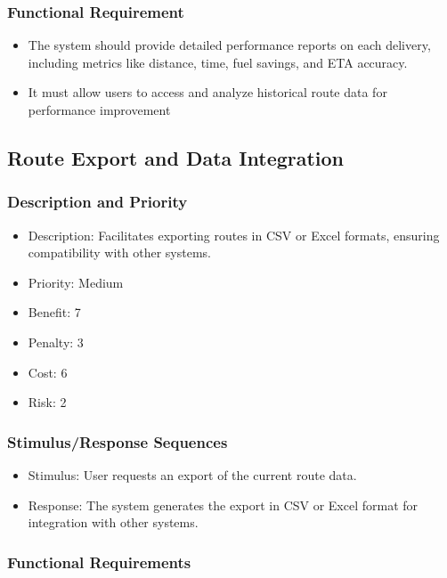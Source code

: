 \subsubsection{Functional Requirement}

\begin{itemize}
    \item The system should provide detailed performance reports on each delivery, including metrics like distance, time, fuel savings, and ETA accuracy.
    \item It must allow users to access and analyze historical route data for performance improvement
\end{itemize}

\subsection{Route Export and Data Integration}
\subsubsection{Description and Priority}

\begin{itemize}
    \item Description: Facilitates exporting routes in CSV or Excel formats, ensuring compatibility with other systems.
    \item Priority: Medium
    \item Benefit: 7
    \item Penalty: 3
    \item Cost: 6
    \item Risk: 2
\end{itemize}

\subsubsection{Stimulus/Response Sequences}

\begin{itemize}
    \item Stimulus: User requests an export of the current route data.
    \item Response: The system generates the export in CSV or Excel format for integration with other systems.
\end{itemize}

\subsubsection{Functional Requirements}

